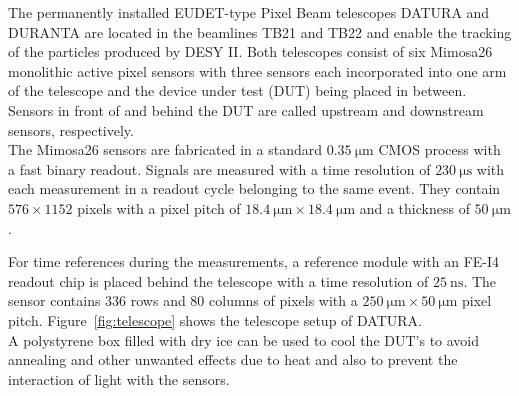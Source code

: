 The permanently installed EUDET-type Pixel Beam telescopes DATURA and DURANTA are located in the beamlines TB21 and TB22 and enable the tracking of the particles
produced by DESY II. Both telescopes consist of six Mimosa26 monolithic active pixel sensors \cite{mimosa26} with %
three sensors each incorporated into one arm of the telescope and the device under test (DUT) being placed in between. Sensors in front of and behind
the DUT are called upstream and downstream sensors, respectively.\\
The Mimosa26 sensors are fabricated in a standard $\SI{0.35}{\micro\meter}$ CMOS process with a fast binary readout.
Signals are measured with a time resolution of $\SI{230}{\micro\second}$ with each measurement in a readout cycle belonging to the same event.
They contain $576 \times 1152$ pixels with a pixel pitch of $\SI{18.4}{\micro\meter} \times \SI{18.4}{\micro\meter}$
and a thickness of $\SI{50}{\micro\meter}$.

For time references during the measurements, a reference module with an FE-I4 readout chip \cite{fei4} is placed behind the telescope with a
time resolution of $\SI{25}{\nano\second}$. The sensor contains 336 rows and 80 columns of pixels with a
$\SI{250}{\micro\meter} \times \SI{50}{\micro\meter}$ pixel pitch. \mbox{Figure \ref{fig:telescope}} shows the telescope setup of DATURA. \\
A polystyrene box filled with dry ice can be used to cool the DUT's to
avoid annealing and other unwanted effects due to heat and also to prevent the interaction of light with the sensors.


